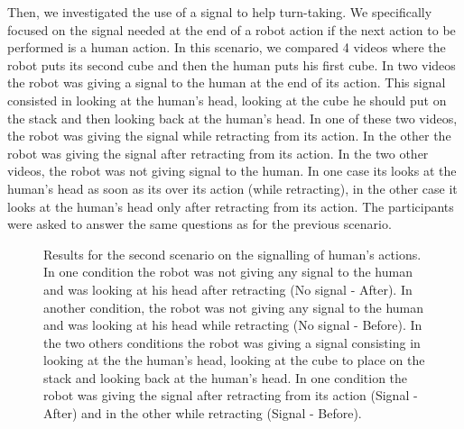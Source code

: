 \documentclass[english,a4paper,11pt,twoside]{StyleThese}
\begin{document}
Then, we investigated the use of a signal to help turn-taking. We specifically focused on the signal needed at the end of a robot action if the next action to be performed is a human action. In this scenario, we compared 4 videos where the robot puts its second cube and then the human puts his first cube. In two videos the robot was giving a signal to the human at the end of its action. This signal consisted in looking at the human's head, looking at the cube he should put on the stack and then looking back at the human's head. In one of these two videos, the robot was giving the signal while retracting from its action. In the other the robot was giving the signal after retracting from its action. In the two other videos, the robot was not giving signal to the human. In one case its looks at the human's head as soon as its over its action (while retracting), in the other case it looks at the human's head only after retracting from its action. The participants were asked to answer the same questions as for the previous scenario.

\begin{figure}[!h]
\centering
    \caption{Results for the second scenario on the signalling of human's actions. In one condition the robot was not giving any signal to the human and was looking at his head after retracting (No signal - After). In another condition, the robot was not giving any signal to the human and was looking at his head while retracting (No signal - Before). In the two others conditions the robot was giving a signal consisting in looking at the the human's head, looking at the cube to place on the stack and looking back at the human's head. In one condition the robot was giving the signal after retracting from its action (Signal - After) and in the other while retracting (Signal - Before).}
    \label{fig:resSce5}
\end{figure}
\end{document}
